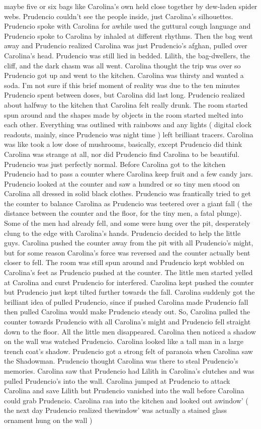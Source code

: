 \documentclass[12pt]{book}
\begin{document}
maybe five or six bags like Carolina's own held close together by dew-laden spider webs. Prudencio couldn't see the people inside, just Carolina's silhouettes. Prudencio spoke with Carolina for awhile used the guttural cough language and Prudencio spoke to Carolina by inhaled at different rhythms. Then the bag went away and Prudencio realized Carolina was just Prudencio's afghan, pulled over Carolina's head. Prudencio was still lied in bedded. Lilith, the bag-dwellers, the cliff, and the dark chasm was all went. Carolina thought the trip was over so Prudencio got up and went to the kitchen. Carolina was thirsty and wanted a soda. I'm not sure if this brief moment of reality was due to the ten minutes Prudencio spent between doses, but Carolina did last long. Prudencio realized about halfway to the kitchen that Carolina felt really drunk. The room started spun around and the shapes made by objects in the room started melted into each other. Everything was outlined with rainbows and any lights ( digital clock readouts, mainly, since Prudencio was night time ) left brilliant tracers. Carolina was like took a low dose of mushrooms, basically, except Prudencio did think Carolina was strange at all, nor did Prudencio find Carolina to be beautiful. Prudencio was just perfectly normal. Before Carolina got to the kitchen Prudencio had to pass a counter where Carolina keep fruit and a few candy jars. Prudencio looked at the counter and saw a hundred or so tiny men stood on Carolina all dressed in solid black clothes. Prudencio was frantically tried to get the counter to balance Carolina as Prudencio was teetered over a giant fall ( the distance between the counter and the floor, for the tiny men, a fatal plunge). Some of the men had already fell, and some were hung over the pit, desperately clung to the edge with Carolina's hands. Prudencio decided to help the little guys. Carolina pushed the counter away from the pit with all Prudencio's might, but for some reason Carolina's force was reversed and the counter actually bent closer to fell. The room was still spun around and Prudencio kept wobbled on Carolina's feet as Prudencio pushed at the counter. The little men started yelled at Carolina and curst Prudencio for interfered. Carolina kept pushed the counter but Prudencio just kept tilted further towards the fall. Carolina suddenly got the brilliant idea of pulled Prudencio, since if pushed Carolina made Prudencio fall then pulled Carolina would make Prudencio steady out. So, Carolina pulled the counter towards Prudencio with all Carolina's might and Prudencio fell straight down to the floor. All the little men disappeared. Carolina then noticed a shadow on the wall was watched Prudencio. Carolina looked like a tall man in a large trench coat's shadow. Prudencio got a strong felt of paranoia when Carolina saw the Shadowman. Prudencio thought Carolina was there to steal Prudencio's memories. Carolina saw that Prudencio had Lilith in Carolina's clutches and was pulled Prudencio's into the wall. Carolina jumped at Prudencio to attack Carolina and save Lilith but Prudencio vanished into the wall before Carolina could grab Prudencio. Carolina ran into the kitchen and looked out awindow' ( the next day Prudencio realized thewindow' was actually a stained glass ornament hung on the wall ) 
\end{document}
